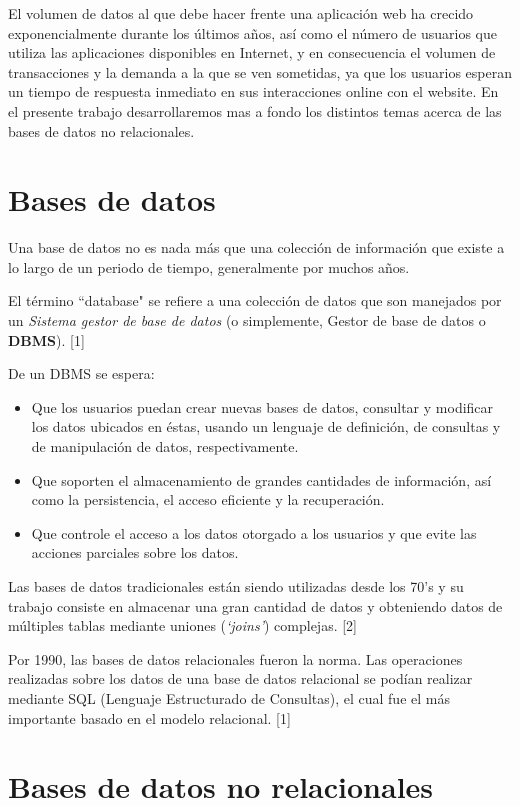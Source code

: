 \documentclass[twocolumn]{article}
\begin{document}
El volumen de datos al que debe hacer frente una aplicación web 
ha crecido exponencialmente durante los últimos años, así como el 
número de usuarios que utiliza las aplicaciones 
disponibles en Internet, y en consecuencia el volumen de transacciones 
y la demanda a la que se ven sometidas, ya que los usuarios esperan un
 tiempo de respuesta inmediato en sus interacciones online con el website.
 En el presente trabajo desarrollaremos mas a fondo los distintos temas
 acerca de las bases de datos no relacionales.


\section{Bases de datos}

Una base de datos no es nada más que una colección de información que existe a lo largo de un periodo de tiempo, generalmente por muchos años.

El término ``database" se refiere a una colección de datos que son manejados por un \textit{Sistema gestor de base de datos} (o simplemente, Gestor de base de datos o \textbf{DBMS}). [1]

De un DBMS se espera:

\begin{itemize}
  \item Que los usuarios puedan crear nuevas bases de datos, consultar y modificar los datos ubicados en éstas, usando un lenguaje de definición, de consultas y de manipulación de datos, respectivamente.
  \item Que soporten el almacenamiento de grandes cantidades de información, así como la persistencia, el acceso eficiente y la recuperación.
  \item Que controle el acceso a los datos otorgado a los usuarios y que evite las acciones parciales sobre los datos.
\end{itemize}

Las bases de datos tradicionales están siendo utilizadas desde los 70's y su trabajo consiste en almacenar una gran cantidad de datos y obteniendo datos de múltiples tablas mediante uniones (\textit{`joins'}) complejas. [2]

Por 1990, las bases de datos relacionales fueron la norma. Las operaciones realizadas sobre los datos de una base de datos relacional se podían realizar mediante SQL (Lenguaje Estructurado de Consultas), el cual fue el más importante basado en el modelo relacional. [1]

\section{Bases de datos no relacionales}
\end{document}
